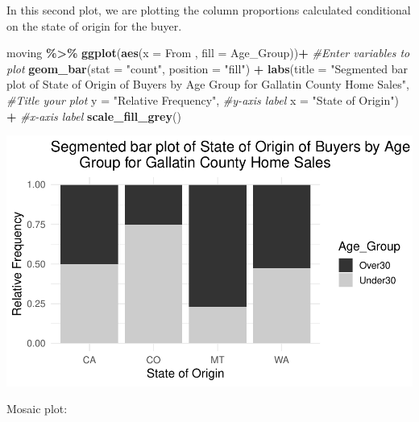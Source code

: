 \documentclass[
]{report}
\newenvironment{Shaded}{\begin{snugshade}}{\end{snugshade}}
\newcommand{\AttributeTok}[1]{\textcolor[rgb]{0.13,0.29,0.53}{#1}}
\newcommand{\CommentTok}[1]{\textcolor[rgb]{0.56,0.35,0.01}{\textit{#1}}}
\newcommand{\FunctionTok}[1]{\textcolor[rgb]{0.13,0.29,0.53}{\textbf{#1}}}
\newcommand{\NormalTok}[1]{#1}
\newcommand{\SpecialCharTok}[1]{\textcolor[rgb]{0.81,0.36,0.00}{\textbf{#1}}}
\newcommand{\StringTok}[1]{\textcolor[rgb]{0.31,0.60,0.02}{#1}}
\begin{document}
In this second plot, we are plotting the column proportions calculated conditional on the state of origin for the buyer.

\begin{Shaded}
\begin{Highlighting}[]
\NormalTok{moving }\SpecialCharTok{\%\textgreater{}\%}
  \FunctionTok{ggplot}\NormalTok{(}\FunctionTok{aes}\NormalTok{(}\AttributeTok{x =}\NormalTok{ From , }\AttributeTok{fill =}\NormalTok{ Age\_Group))}\SpecialCharTok{+} \CommentTok{\#Enter variables to plot}
  \FunctionTok{geom\_bar}\NormalTok{(}\AttributeTok{stat =} \StringTok{"count"}\NormalTok{, }\AttributeTok{position =} \StringTok{"fill"}\NormalTok{) }\SpecialCharTok{+}
  \FunctionTok{labs}\NormalTok{(}\AttributeTok{title =} \StringTok{"Segmented bar plot of State of Origin of Buyers by Age }
\StringTok{       Group for Gallatin County Home Sales"}\NormalTok{, }
       \CommentTok{\#Title your plot}
       \AttributeTok{y =} \StringTok{"Relative Frequency"}\NormalTok{, }\CommentTok{\#y{-}axis label}
       \AttributeTok{x =} \StringTok{"State of Origin"}\NormalTok{) }\SpecialCharTok{+} \CommentTok{\#x{-}axis label}
  \FunctionTok{scale\_fill\_grey}\NormalTok{()}
\end{Highlighting}
\end{Shaded}

\begin{center}\includegraphics[width=0.55\linewidth]{03-LN03-EDA_files/figure-latex/unnamed-chunk-9-1} \end{center}

Mosaic plot:
\end{document}
